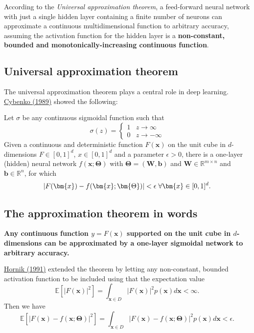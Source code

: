 \documentclass[%
oneside,                 %
final,                   %
10pt]{article}
\begin{document}
According to the \emph{Universal approximation theorem}, a feed-forward
neural network with just a single hidden layer containing a finite
number of neurons can approximate a continuous multidimensional
function to arbitrary accuracy, assuming the activation function for
the hidden layer is a \textbf{non-constant, bounded and
monotonically-increasing continuous function}.

\subsection{Universal approximation theorem}

The universal approximation theorem plays a central role in deep
learning.  \href{{https://link.springer.com/article/10.1007/BF02551274}}{Cybenko (1989)} showed
the following:

\begin{block}{}
Let $\sigma$ be any continuous sigmoidal function such that
\[
\sigma(z) = \left\{\begin{array}{cc} 1 & z\rightarrow \infty\\ 0 & z \rightarrow -\infty \end{array}\right.
\]
Given a continuous and deterministic function $F(\bm{x})$ on the unit
cube in $d$-dimensions $F\in [0,1]^d$, $x\in [0,1]^d$ and a parameter
$\epsilon >0$, there is a one-layer (hidden) neural network
$f(\bm{x};\bm{\Theta})$ with $\bm{\Theta}=(\bm{W},\bm{b})$ and $\bm{W}\in
\mathbb{R}^{m\times n}$ and $\bm{b}\in \mathbb{R}^{n}$, for which
\[
\vert F(\bm{x})-f(\bm{x};\bm{\Theta})\vert < \epsilon \hspace{0.1cm} \forall \bm{x}\in[0,1]^d.
\]

\end{block}

\subsection{The approximation theorem in words}

\textbf{Any continuous function $y=F(\bm{x})$ supported on the unit cube in
$d$-dimensions can be approximated by a one-layer sigmoidal network to
arbitrary accuracy.}

\href{{https://www.sciencedirect.com/science/article/abs/pii/089360809190009T}}{Hornik (1991)} extended the theorem by letting any non-constant, bounded activation function to be included using that the expectation value
\[
\mathbb{E}[\vert F(\bm{x})\vert^2] =\int_{\bm{x}\in D} \vert F(\bm{x})\vert^2p(\bm{x})d\bm{x} < \infty.
\]
Then we have
\[
\mathbb{E}[\vert F(\bm{x})-f(\bm{x};\bm{\Theta})\vert^2] =\int_{\bm{x}\in D} \vert F(\bm{x})-f(\bm{x};\bm{\Theta})\vert^2p(\bm{x})d\bm{x} < \epsilon.
\]
\end{document}

